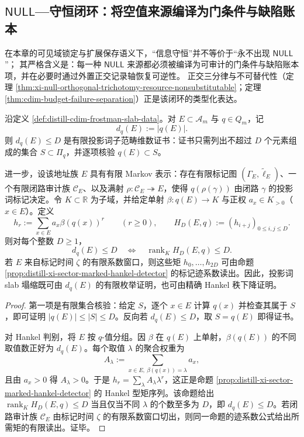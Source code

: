 \subsection{\texorpdfstring{$\mathsf{NULL}$}{NULL}—守恒闭环：将空值来源编译为门条件与缺陷账本}\label{subsec:cdim-null-conservation-loop}
在本章的可见域锁定与扩展保存语义下，“信息守恒”并不等价于“永不出现 \(\mathsf{NULL}\)”；
其严格含义是：每一种 \(\mathsf{NULL}\) 来源都必须被编译为可审计的门条件与缺陷账本项，并在必要时通过外置正交记录轴恢复可逆性。
正交三分律与不可替代性（定理 \ref{thm:xi-null-orthogonal-trichotomy-resource-nonsubstitutable}；定理 \ref{thm:cdim-budget-failure-separation}）正是该闭环的类型化表达。

\begin{proposition}\label{prop:distill-cdim-slab-hankel-rank-certificate}
沿定义 \ref{def:distill-cdim-frostman-slab-data}。对 \(E\subset\mathcal A_m\) 与 \(q\in Q_m\)，记
\[
d_q(E):=|q(E)|.
\]
则 \(d_q(E)\le D\) 是有限投影词子范畴维数证书：证书只需列出不超过 \(D\) 个元素组成的集合 \(S\subset\Pi_q\)，并逐项核验 \(q(E)\subset S\)。

进一步，设该地址族 \(E\) 具有有限 Markov 表示：存在有限标记图 \((\Gamma_E,\widetilde\ell_E)\)、一个有限闭路审计族 \(\mathcal C_E\)、以及满射 \(\rho:\mathcal C_E\twoheadrightarrow E\)，使得 \(q(\rho(\gamma))\) 由闭路 \(\gamma\) 的投影词标记决定。令 \(K\subset\mathbb R\) 为子域，并给定单射 \(\beta:q(E)\to K\) 与正权 \(a_x\in K_{>0}\)（\(x\in E\)）。定义
\[
h_r:=\sum_{x\in E}a_x\beta(q(x))^r\qquad(r\ge 0),
\qquad
H_D(E,q):=(h_{i+j})_{0\le i,j\le D}.
\]
则对每个整数 \(D\ge 1\)，
\[
d_q(E)\le D
\quad\Longleftrightarrow\quad
\operatorname{rank}_K H_D(E,q)\le D.
\]
若 \(E\) 来自标记时间 \(\zeta\) 的有限系数窗口，则这些矩 \(h_0,\dots,h_{2D}\) 可由命题 \ref{prop:distill-xi-sector-marked-hankel-detector} 的标记迹系数读出。因此，投影词 slab 塌缩既可由 \(d_q(E)\) 的有限枚举证明，也可由精确 Hankel 秩下降证明。
\end{proposition}
\begin{proof}
第一项是有限集合核验：给定 \(S\)，逐个 \(x\in E\) 计算 \(q(x)\) 并检查其属于 \(S\)，即可证明 \(|q(E)|\le |S|\le D\)。反向若 \(d_q(E)\le D\)，取 \(S=q(E)\) 即得证书。

对 Hankel 判别，将 \(E\) 按 \(q\)-值分组。因 \(\beta\) 在 \(q(E)\) 上单射，\(\beta(q(E))\) 的不同取值数正好为 \(d_q(E)\)。每个取值 \(\lambda\) 的聚合权重为
\[
A_\lambda:=\sum_{x\in E,\ \beta(q(x))=\lambda}a_x,
\]
且由 \(a_x>0\) 得 \(A_\lambda>0\)。于是 \(h_r=\sum_\lambda A_\lambda\lambda^r\)，这正是命题 \ref{prop:distill-xi-sector-marked-hankel-detector} 的 Hankel 型矩序列。该命题给出 \(\operatorname{rank}_K H_D(E,q)\le D\) 当且仅当不同 \(\lambda\) 的个数至多为 \(D\)，即 \(d_q(E)\le D\)。若闭路审计族 \(\mathcal C_E\) 由标记时间 \(\zeta\) 的有限系数窗口切出，则同一命题的迹系数公式给出所需矩的有限读出。证毕。
\end{proof}

